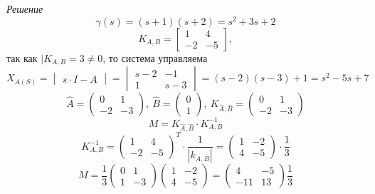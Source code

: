 \documentclass[../../TAU.tex]{subfiles}
\begin{document}
    {\it Решение}
    $$
        \gamma(s)=(s+1)(s+2)=s^2+3s+2
    $$
    $$
        K_{A,B} = 
        \begin{bmatrix}
            1 & 4\\
            -2 & -5
        \end{bmatrix}
        ,
    $$
    так как $|K_{A,B}=3\neq0$, то система управляема
    $$
        X_{A(S)}=
        \begin{vmatrix}
            s\cdot I - A
        \end{vmatrix}
        =
        \begin{vmatrix}
            s-2 & -1\\
            1 & s-3
        \end{vmatrix}
        =(s-2)(s-3)+1 = s^2-5s+7
    $$
    $$
        \widehat A =
        \begin{pmatrix}
            0 & 1\\
            -2 & -3
        \end{pmatrix},\ 
        \widehat B=
        \begin{pmatrix}
            0 \\ 1
        \end{pmatrix},\ 
        K_{\widehat A,\widehat B} = 
        \begin{pmatrix}
            0 & 1\\
            -2 & -3
        \end{pmatrix}
    $$
    $$
        M = K_{\widehat A, \widehat B}\cdot K^{-1}_{A,B}
    $$
    $$
        K^{-1}_{A,B}=
        \begin{pmatrix}
            1 & 4\\
            -2 & -5
        \end{pmatrix}^{T}\cdot
        \frac{1}{|k_{A, B}|}
        =
        \begin{pmatrix}
            1 & -2\\
            4 & -5
        \end{pmatrix}\cdot
        \frac{1}{3}        
    $$
    $$
        M=\frac{1}{3}  
        \begin{pmatrix}
            0 & 1\\
            1 & -3
        \end{pmatrix}
        \begin{pmatrix}
            1 & -2\\
            4 & -5
        \end{pmatrix}
        =
        \begin{pmatrix}
            4 & -5\\
            -11 & 13
        \end{pmatrix}
        \frac{1}{3}  
    $$
\end{document}
